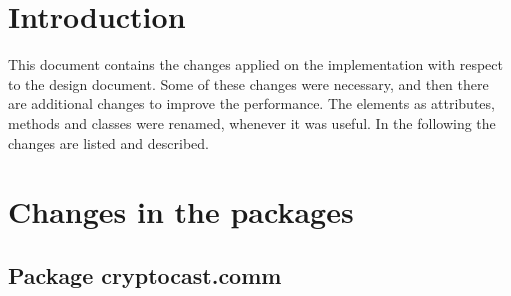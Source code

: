 \documentclass[a4paper,10pt]{scrartcl}
\title{\doctitle}
\author{\authorName}
\date{\today}
\begin{document}

\tableofcontents
\clearpage

\section{Introduction}
This document contains the changes applied on the implementation with respect to the design document.
Some of these changes were necessary, and then there are additional changes to improve the performance.
The elements as attributes, methods and classes were renamed, whenever it was useful. In the following the
changes are listed and described.

\section{Changes in the packages}
\subsection{Package cryptocast.comm}
\end{document}
